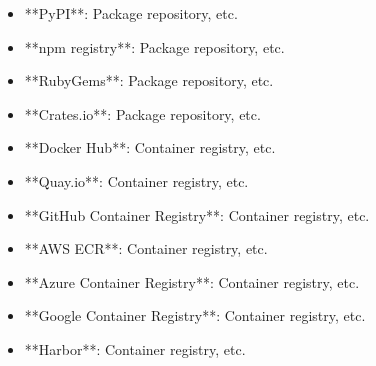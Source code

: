 \documentclass[11pt,a4paper]{article}
\begin{document}
\begin{itemize}
\item **PyPI**: Package repository, etc.
\end{itemize}

\begin{itemize}
\item **npm registry**: Package repository, etc.
\end{itemize}

\begin{itemize}
\item **RubyGems**: Package repository, etc.
\end{itemize}

\begin{itemize}
\item **Crates.io**: Package repository, etc.
\end{itemize}

\begin{itemize}
\item **Docker Hub**: Container registry, etc.
\end{itemize}

\begin{itemize}
\item **Quay.io**: Container registry, etc.
\end{itemize}

\begin{itemize}
\item **GitHub Container Registry**: Container registry, etc.
\end{itemize}

\begin{itemize}
\item **AWS ECR**: Container registry, etc.
\end{itemize}

\begin{itemize}
\item **Azure Container Registry**: Container registry, etc.
\end{itemize}

\begin{itemize}
\item **Google Container Registry**: Container registry, etc.
\end{itemize}

\begin{itemize}
\item **Harbor**: Container registry, etc.
\end{itemize}
\end{document}
